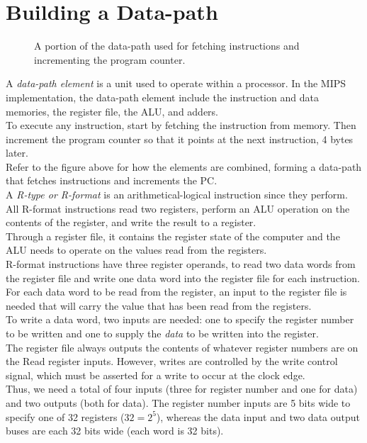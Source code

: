 \documentclass[12pt]{article}
\theoremstyle{definition}
\newcommand{\includePicture}[3]{
  \begin{figure}[!ht]
  \centering
  \scalebox{#1}{\texttt{[image: \#2]}}
  \caption{#3}
  \end{figure}
}
\begin{document}
  \section{Building a Data-path}
  \includePicture{0.7}{pictures/readingFetchingInstruction.png}{A portion of the data-path used for fetching instructions and incrementing the program counter.}
  A \emph{data-path element} is a unit used to operate within a processor.
  In the MIPS implementation, the data-path element include the instruction and data memories, the register file, the ALU, and adders. \\
  To execute any instruction, start by fetching the instruction from memory.
  Then increment the program counter so that it points at the next instruction, 4 bytes later. \\
  Refer to the figure above for how the elements are combined, forming a data-path that fetches instructions and increments the PC. \\

  A \emph{R-type \emph{or} R-format} is an arithmetical-logical instruction since they perform. \\
  All R-format instructions read two registers, perform an ALU operation on the contents of the register, and write the result to a register. \\

  Through a register file, it contains the register state of the computer and the ALU needs to operate on the values read from the registers. \\
  R-format instructions have three register operands, to read two data words from the register file and write one data word into the register file for each instruction. \\
  For each data word to be read from the register, an input to the register file is needed that will carry the value that has been read from the registers. \\
  To write a data word, two inputs are needed: one to specify the register number to be written and one to supply the \emph{data} to be written into the register. \\
  The register file always outputs the contents of whatever register numbers are on the Read register inputs.
  However, writes are controlled by the write control signal, which must be asserted for a write to occur at the clock edge. \\

  Thus, we need a total of four inputs (three for register number and one for data) and two outputs (both for data).
  The register number inputs are 5 bits wide to specify one of 32 registers ($32 = 2^{5}$), whereas the data input and two data output buses are each 32 bits wide (each word is 32 bits).
\end{document}
